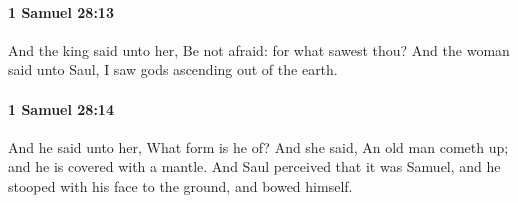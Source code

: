 		\paragraph{1 Samuel 28:13} %
			\label{1SAMUEL-28-13}

			And the king said unto her, Be not afraid: for what sawest thou? And the woman said unto Saul, I saw gods ascending out of the earth.


		\paragraph{1 Samuel 28:14} %
			\label{1SAMUEL-28-14}

			And he said unto her, What form is he of? And she said, An old man cometh up; and he is covered with a mantle. And Saul perceived that it was Samuel, and he stooped with his face to the ground, and bowed himself.


